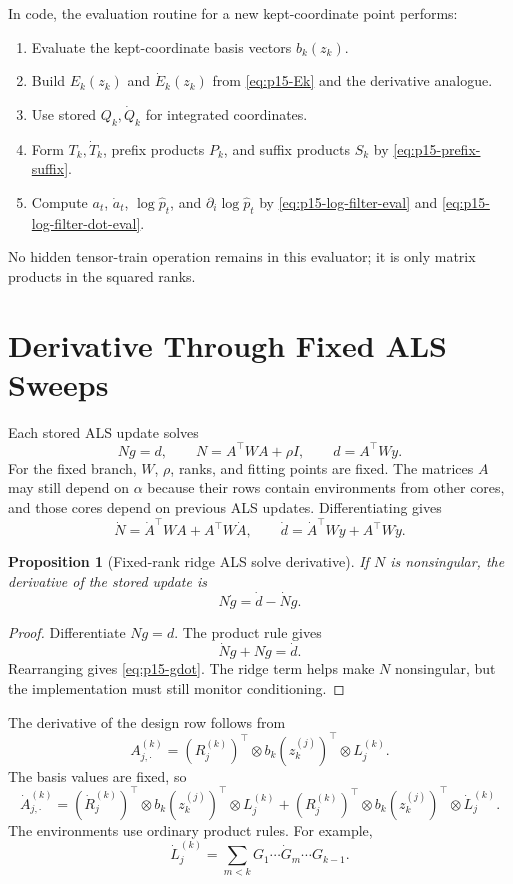 \documentclass[11pt]{article}
\newtheorem{proposition}{Proposition}
\theoremstyle{definition}
\theoremstyle{remark}
\renewcommand{\[}{\begin{equation}}
\renewcommand{\]}{\end{equation}}
\begin{document}
In code, the evaluation routine for a new kept-coordinate point performs:
\begin{enumerate}[label=\textbf{E\arabic*.},leftmargin=*]
\item Evaluate the kept-coordinate basis vectors \(b_k(z_k)\).
\item Build \(E_k(z_k)\) and \(\dot E_k(z_k)\) from
\eqref{eq:p15-Ek} and the derivative analogue.
\item Use stored \(Q_k,\dot Q_k\) for integrated coordinates.
\item Form \(T_k,\dot T_k\), prefix products \(P_k\), and suffix products
\(S_k\) by \eqref{eq:p15-prefix-suffix}.
\item Compute \(a_t\), \(\dot a_t\), \(\log\widehat p_t\), and
\(\partial_i\log\widehat p_t\) by
\eqref{eq:p15-log-filter-eval} and \eqref{eq:p15-log-filter-dot-eval}.
\end{enumerate}
No hidden tensor-train operation remains in this evaluator; it is only matrix
products in the squared ranks.

\section{Derivative Through Fixed ALS Sweeps}

Each stored ALS update solves
\[
  N g=d,\qquad N=A^\top W A+\rho I,\qquad d=A^\top W y.
  \label{eq:p15-Ngd}
\]
For the fixed branch, \(W\), \(\rho\), ranks, and fitting points are fixed.
The matrices \(A\) may still depend on \(\alpha\) because their rows contain
environments from other cores, and those cores depend on previous ALS updates.
Differentiating gives
\[
  \dot N=\dot A^\top W A+A^\top W\dot A,
  \qquad
  \dot d=\dot A^\top W y+A^\top W\dot y.
  \label{eq:p15-Nd-dot}
\]

\begin{proposition}[Fixed-rank ridge ALS solve derivative]
If \(N\) is nonsingular, the derivative of the stored update is
\[
  N\dot g=\dot d-\dot N g.
  \label{eq:p15-gdot}
\]
\end{proposition}

\begin{proof}
Differentiate \(Ng=d\).  The product rule gives
\[
  \dot N g+N\dot g=\dot d.
\]
Rearranging gives \eqref{eq:p15-gdot}.  The ridge term helps make \(N\)
nonsingular, but the implementation must still monitor conditioning.
\end{proof}

The derivative of the design row follows from
\[
  A_{j,\cdot}^{(k)}
  =
  (R_j^{(k)})^\top\otimes b_k(z_k^{(j)})^\top\otimes L_j^{(k)}.
\]
The basis values are fixed, so
\[
  \dot A_{j,\cdot}^{(k)}
  =
  (\dot R_j^{(k)})^\top\otimes b_k(z_k^{(j)})^\top\otimes L_j^{(k)}
  +
  (R_j^{(k)})^\top\otimes b_k(z_k^{(j)})^\top\otimes \dot L_j^{(k)}.
  \label{eq:p15-Adot-row}
\]
The environments use ordinary product rules.  For example,
\[
  \dot L_j^{(k)}
  =
  \sum_{m<k}
  G_1\cdots \dot G_m\cdots G_{k-1}.
  \label{eq:p15-Ldot}
\]
\end{document}
